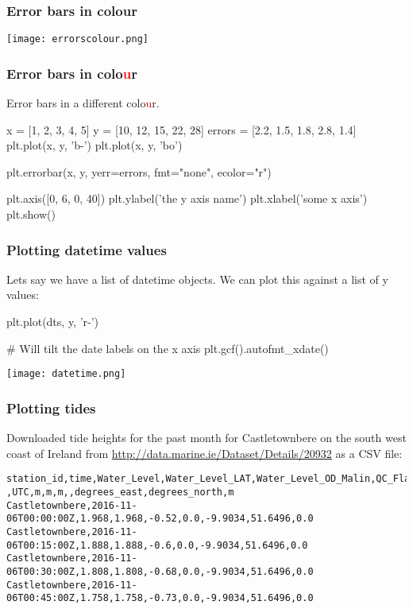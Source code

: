 \documentclass{beamer}
\begin{document}
\begin{frame}[fragile]
\frametitle{Error bars in colour}
\texttt{[image: errorscolour.png]}
\end{frame}

\begin{frame}[fragile]
\frametitle{Error bars in colo\textcolor{red}{u}r}

Error bars in a different colo\textcolor{red}{u}r.

\begin{code}
x = [1, 2, 3, 4, 5]
y = [10, 12, 15, 22, 28]
errors = [2.2, 1.5, 1.8, 2.8, 1.4]
plt.plot(x, y, 'b-')
plt.plot(x, y, 'bo')

plt.errorbar(x, y, yerr=errors, fmt="none", ecolor="r")

plt.axis([0, 6, 0, 40])
plt.ylabel('the y axis name')
plt.xlabel('some x axis')
plt.show()
\end{code}
\end{frame}


\begin{frame}[fragile]
\frametitle{Plotting datetime values}
Lets say we have a list of datetime objects. We can plot this against
a list of y values:
\begin{code}
plt.plot(dts, y, 'r-')

# Will tilt the date labels on the x axis
plt.gcf().autofmt_xdate()
\end{code}

\bigskip

\bigskip

\texttt{[image: datetime.png]}

\end{frame}


\begin{frame}[fragile]
\frametitle{Plotting tides}

Downloaded tide heights for the past month for Castletownbere on the south west coast of Ireland from \url{http://data.marine.ie/Dataset/Details/20932} as a CSV file:

\bigskip

\begin{footnotesize}
\begin{verbatim}
station_id,time,Water_Level,Water_Level_LAT,Water_Level_OD_Malin,QC_Flag,longitude,latitude,altitude
,UTC,m,m,m,,degrees_east,degrees_north,m
Castletownbere,2016-11-06T00:00:00Z,1.968,1.968,-0.52,0.0,-9.9034,51.6496,0.0
Castletownbere,2016-11-06T00:15:00Z,1.888,1.888,-0.6,0.0,-9.9034,51.6496,0.0
Castletownbere,2016-11-06T00:30:00Z,1.808,1.808,-0.68,0.0,-9.9034,51.6496,0.0
Castletownbere,2016-11-06T00:45:00Z,1.758,1.758,-0.73,0.0,-9.9034,51.6496,0.0
\end{verbatim}
\end{footnotesize}

\end{frame}
\end{document}
